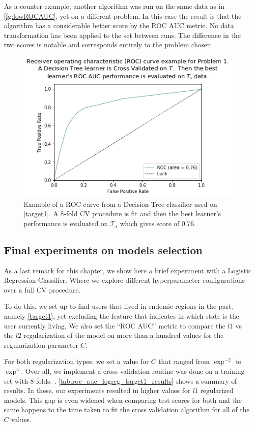 As a counter example, another algorithm was run on the same data as in \cref{fg:lowROCAUC}, yet on a different problem.
In this case the result is that the algorithm has a considerable better score by the ROC AUC metric.
No data transformation has been applied to the set between runs.
The difference in the two scores is notable and corresponds entirely to the problem chosen.

\begin{figure}[h!]
\begin{center}
\includegraphics[width=0.7\columnwidth]{figures/figure-highROCAUC/figure-highROCAUC}
\caption{Example of a ROC curve from a Decision Tree classifier used on \cref{target1}. A 8-fold CV procedure is fit and then the best learner's performance is evaluated on $\mathcal{T_s}$ which gives score of $0.76$.}
\label{fg:highROCAUC}
\end{center}
\end{figure}


\subsection{Final experiments on models selection}\label{sub:final_model_selection}

As a last remark for this chapter, we show here a brief experiment with a Logistic Regression Classifier. Where we explore different hyperparameter configurations over a full CV procedure.

To do this, we set up to find users that lived in endemic regions in the past, namely \cref{target1}, yet excluding the feature that indicates in which state is the user currently living.
We also set the ``ROC AUC'' metric to compare the $l1$ vs the $l2$ regularization of the model on more than a hundred values for the regularization parameter $C$.

For both regularization types, we set a value for $C$ that ranged from $\exp^{-2}$ to $\exp^{5}$. Over all, we implement a cross validation routine was done on a training set with 8-folds.
.
\cref{tab:roc_auc_logreg_target1_results} shows a summary of results.
In these, our experiments resulted in higher values for $l1$ regularized models.
This gap is even widened when comparing test scores for both and the same happens to the time taken to fit the cross validation algorithm for all of the $C$ values.


